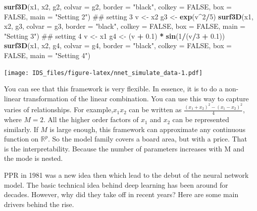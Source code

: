 \documentclass[12pt,]{krantz}
\makeatletter
\newenvironment{Shaded}{\begin{snugshade}}{\end{snugshade}}
\newcommand{\KeywordTok}[1]{\textcolor[rgb]{0.27,0.27,0.27}{\textbf{#1}}}
\newcommand{\DataTypeTok}[1]{\textcolor[rgb]{0.27,0.27,0.27}{#1}}
\newcommand{\DecValTok}[1]{\textcolor[rgb]{0.06,0.06,0.06}{#1}}
\newcommand{\FloatTok}[1]{\textcolor[rgb]{0.06,0.06,0.06}{#1}}
\newcommand{\StringTok}[1]{\textcolor[rgb]{0.5,0.5,0.5}{#1}}
\newcommand{\OtherTok}[1]{\textcolor[rgb]{0.37,0.37,0.37}{#1}}
\newcommand{\OperatorTok}[1]{\textcolor[rgb]{0.43,0.43,0.43}{\textbf{#1}}}
\newcommand{\NormalTok}[1]{#1}
\newenvironment{kframe}{%
\medskip{}
\setlength{\fboxsep}{.8em}
 \def\at@end@of@kframe{}%
 \ifinner\ifhmode%
  \def\at@end@of@kframe{\end{minipage}}%
  \begin{minipage}{\columnwidth}%
 \fi\fi%
 \def\FrameCommand##1{\hskip\@totalleftmargin \hskip-\fboxsep
 \colorbox{shadecolor}{##1}\hskip-\fboxsep
     \hskip-\linewidth \hskip-\@totalleftmargin \hskip\columnwidth}%
 \MakeFramed {\advance\hsize-\width
   \@totalleftmargin\z@ \linewidth\hsize
   \@setminipage}}%
 {\par\unskip\endMakeFramed%
 \at@end@of@kframe}
\renewenvironment{Shaded}{\begin{kframe}}{\end{kframe}}
\theoremstyle{definition}
\theoremstyle{definition}
\theoremstyle{definition}
\theoremstyle{remark}
\makeatother
\begin{document}
\begin{Shaded}
\begin{Highlighting}[]
\KeywordTok{surf3D}\NormalTok{(x1, x2, g2, }\DataTypeTok{colvar =}\NormalTok{ g2, }\DataTypeTok{border =} \StringTok{"black"}\NormalTok{, }\DataTypeTok{colkey =} \OtherTok{FALSE}\NormalTok{, }\DataTypeTok{box =} \OtherTok{FALSE}\NormalTok{, }
    \DataTypeTok{main =} \StringTok{"Setting 2"}\NormalTok{)}
\NormalTok{## setting 3}
\NormalTok{v <-}\StringTok{ }\NormalTok{x2}
\NormalTok{g3 <-}\StringTok{ }\KeywordTok{exp}\NormalTok{(v}\OperatorTok{^}\DecValTok{2}\OperatorTok{/}\DecValTok{5}\NormalTok{)}
\KeywordTok{surf3D}\NormalTok{(x1, x2, g3, }\DataTypeTok{colvar =}\NormalTok{ g3, }\DataTypeTok{border =} \StringTok{"black"}\NormalTok{, }\DataTypeTok{colkey =} \OtherTok{FALSE}\NormalTok{, }\DataTypeTok{box =} \OtherTok{FALSE}\NormalTok{, }
    \DataTypeTok{main =} \StringTok{"Setting 3"}\NormalTok{)}
\NormalTok{## setting 4}
\NormalTok{v <-}\StringTok{ }\NormalTok{x1}
\NormalTok{g4 <-}\StringTok{ }\NormalTok{(v }\OperatorTok{+}\StringTok{ }\FloatTok{0.1}\NormalTok{) }\OperatorTok{*}\StringTok{ }\KeywordTok{sin}\NormalTok{(}\DecValTok{1}\OperatorTok{/}\NormalTok{(v}\OperatorTok{/}\DecValTok{3} \OperatorTok{+}\StringTok{ }\FloatTok{0.1}\NormalTok{))}
\KeywordTok{surf3D}\NormalTok{(x1, x2, g4, }\DataTypeTok{colvar =}\NormalTok{ g4, }\DataTypeTok{border =} \StringTok{"black"}\NormalTok{, }\DataTypeTok{colkey =} \OtherTok{FALSE}\NormalTok{, }\DataTypeTok{box =} \OtherTok{FALSE}\NormalTok{, }
    \DataTypeTok{main =} \StringTok{"Setting 4"}\NormalTok{)}
\end{Highlighting}
\end{Shaded}

\texttt{[image: IDS\_files/figure-latex/nnet\_simulate\_data-1.pdf]}

You can see that this framework is very flexible. In essence, it is to
do a non-linear transformation of the linear combination. You can use
this way to capture varies of relationships. For example,\(x_{1}x_{2}\)
can be written as \(\frac{(x_{1}+x_{2})^{2}-(x_{1}-x_{2})^{2}}{4}\),
where \(M=2\). All the higher order factors of \(x_1\) and \(x_2\) can
be represented similarly. If \(M\) is large enough, this framework can
approximate any continuous function on \(\mathbb{R}^{p}\). So the model
family covers a board area, but with a price. That is the
interpretability. Because the number of parameters increases with M and
the mode is nested.

PPR in 1981 was a new idea then which lead to the debut of the neural
network model. The basic technical idea behind deep learning has been
around for decades. However, why did they take off in recent years? Here
are some main drivers behind the rise.
\end{document}
